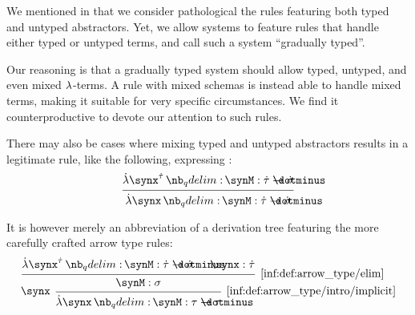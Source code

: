 \begin{remark}\label{rem:mixed_terms_and_typing_style}
  We mentioned in  that we consider pathological the rules featuring both typed and untyped abstractors. Yet, we allow systems to feature  rules that handle either typed or untyped terms, and call such a system \enquote{gradually typed}.

  Our reasoning is that a gradually typed system should allow typed, untyped, and even mixed \( {\mathrm \lambda} \)-terms. A rule with mixed schemas is instead able to  handle mixed terms, making it suitable for very specific circumstances. We find it counterproductive to devote our attention to such rules.

  There may also be cases where mixing typed and untyped abstractors results in a legitimate rule, like the following, expressing :
  \begin{equation*}
    \begin{prooftree}
      \hypo{ \qabs {\synx^{\syn\tau}} \synM: \syn\tau \synimplies \syn\sigma }
      \infer1{ \qabs \synx \synM: \syn\tau \synimplies \syn\sigma }
    \end{prooftree}
  \end{equation*}

  It is however merely an abbreviation of a derivation tree featuring the more carefully crafted arrow type rules:
  \begin{equation*}
    \begin{prooftree}
      \hypo{ \qabs {\synx^{\syn\tau}} \synM: \syn\tau \synimplies \syn\sigma }
      \hypo{ \synx: \syn\tau }
      \infer2[\ref{inf:def:arrow_type/elim}]{ \synM: \sigma }
      \infer[left label=\( \synx \)]1[\ref{inf:def:arrow_type/intro/implicit}]{ \qabs \synx \synM: \tau \synimplies \tau }
    \end{prooftree}
  \end{equation*}
\end{remark}

